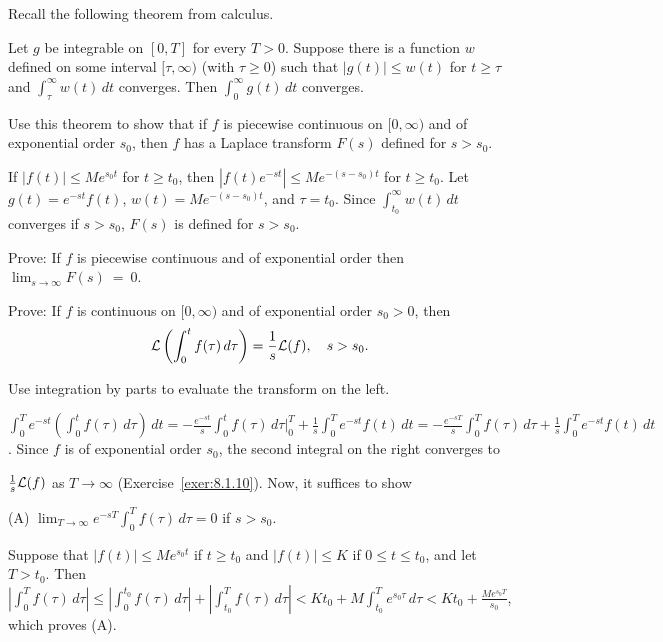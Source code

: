 \documentclass{ximera}
\begin{document}
\begin{problem}\label{exer:8.1.10}
Recall the following theorem from calculus.

\begin{theorem}
    Let $g$ be integrable on $[0,T]$ for
every $T>0.$  Suppose there is a function $w$ defined on some
interval $[\tau,\infty)$ (with $\tau\ge 0$) such that $|g(t)|\le
w(t)$ for $t\ge\tau$ and $\int^\infty_\tau w(t)\,dt$
converges.  Then $\int_0^\infty g(t)\,dt$ converges.
\end{theorem} 

Use this theorem to show that if $f$ is piecewise continuous on
$[0,\infty)$ and of exponential order $s_0$, then $f$ has a Laplace
transform $F(s)$ defined for $s>s_0$.

\begin{solution}
If $|f(t)|\le Me^{s_0t}$ for  $t\ge t_0$, then
$|f(t)e^{-st}|\le Me^{-(s-s_0)t}$ for  $t\ge t_0$. Let
 $g(t)=e^{-st}f(t)$, $w(t)=Me^{-(s-s_0)t}$, and $\tau=t_0$.
Since $\int_{t_0}^\infty w(t)\,dt$ converges if $s>s_0$, $F(s)$
is defined for $s>s_0$.
\end{solution}
\end{problem}

\begin{problem}\label{exer:8.1.11}
 Prove: If $f$ is piecewise continuous and of exponential order
then $\lim_{s\to\infty}F(s)~=~0$.
\end{problem}

\begin{problem}\label{exer:8.1.12}
Prove: If $f$ is continuous on $[0,\infty)$ and of exponential order
$s_0>0$, then
$$
{\cal L}\left(\int^t_0 f(\tau)\,d\tau\right)=\frac{1}{s} {\cal L} (f),
\quad s>s_0.
$$
\begin{hint}
Use integration by parts to evaluate the transform on
the left. 
\end{hint}

\begin{solution}
$\int_0^Te^{-st}\left(\int_0^tf(\tau)\,d\tau\right)\,dt
=-\frac{e^{-st}}{s}\int_0^t f(\tau)\,d\tau\bigg|_0^T+\frac{1}{s}\int_0^Te^{-st}f(t)\,dt =-\frac{e^{-sT}}{s}\int_0^T
f(\tau)\,d\tau+\frac{1}{s}\int_0^Te^{-st}f(t)\,dt$. Since $f$ is of
exponential order $s_0$, the second integral on the right converges to

$\frac{1}{s}{\cal L}(f)$ as $T\to\infty$ (Exercise~\ref{exer:8.1.10}).
Now, it suffices to show

(A) $\lim_{T\to\infty}e^{-sT}\int_0^Tf(\tau)\,d\tau=0$ if $s>s_0$.

Suppose that $|f(t)|\le Me^{s_0t}$ if $t\ge t_0$ and $|f(t)|\le K$ if
$0\le t\le t_0$, and let $T> t_0$. Then
$\left|\int_0^Tf(\tau)\,d\tau\right|
\le\left|\int_0^{t_0}f(\tau)\,d\tau\right|+
\left|\int_{t_0}^Tf(\tau)\,d\tau \right|<Kt_0+M\int_{t_0}^T
e^{s_0\tau}\,d\tau<Kt_0+\frac{Me^{s_0T}}{s_0}$, which proves (A).

\end{solution}
\end{problem}
\end{document}
